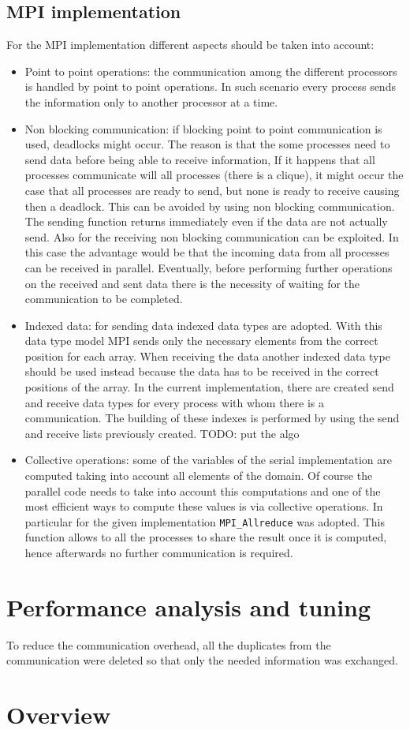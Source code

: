 \documentclass[12pt, a4paper]{article}
\begin{document}
  \subsection*{MPI implementation}
  For the MPI implementation different aspects should be taken into account:
  \begin{itemize}
    \item Point to point operations: the communication among the different
          processors is handled by point to point operations. In such scenario
          every process sends the information only to another processor at a
          time.
    \item Non blocking communication: if blocking point to point communication 
          is used, deadlocks might occur. The reason is that the some processes
          need to send data before being able to receive information, If it
          happens that all processes communicate will all processes (there is a
          clique), it might occur the case that all processes are ready to
          send, but none is ready to receive causing then a deadlock. This can
          be avoided by using non blocking communication. The sending function
          returns immediately even if the data are not actually send. Also for
          the receiving non blocking communication can be exploited. In this
          case the advantage would be that the incoming data from all processes
          can be received in parallel. Eventually, before performing further
          operations on the received and sent data there is the necessity of
          waiting for the communication to be completed.
    \item Indexed data: for sending data indexed data types are adopted. With
          this data type model MPI sends only the necessary elements from the
          correct position for each array. When receiving the data another
          indexed data type should be used instead because the data has to be
          received in the correct positions of the array. In the current
          implementation, there are created send and receive data types for
          every process with whom there is a communication. The building of
          these indexes is performed by using the send and receive lists
          previously created. 
          TODO: put the algo
    \item Collective operations: some of the variables of the serial
          implementation are computed taking into account all elements of the
          domain. Of course the parallel code needs to take into account this
          computations and one of the most efficient ways to compute these
          values is via collective operations. In particular for the given
          implementation \verb=MPI_Allreduce=  was adopted. This
          function allows to all the processes to share the result once it is
          computed, hence afterwards no further communication is required.
  \end{itemize}

\section{Performance analysis and tuning}
To reduce the communication overhead, all the duplicates from the communication
were deleted so that only the needed information was exchanged.

\section{Overview}
\end{document}
